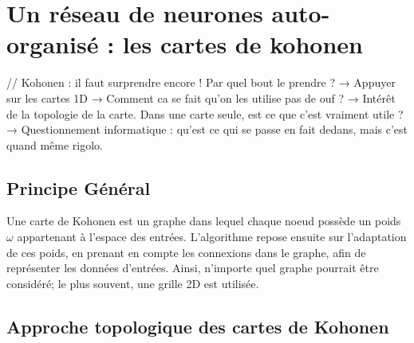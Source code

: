 \chapter{Un réseau de neurones auto-organisé : les cartes de kohonen}
\graphicspath{{02-SOM/}}
// Kohonen : il faut surprendre encore ! Par quel 
bout le prendre ? 
→ Appuyer sur les cartes 1D
→ Comment ca se fait qu’on les utilise pas de ouf ? 
→  Intérêt de la topologie de la carte. Dans une carte seule, est ce que c’est vraiment utile ?
→ Questionnement informatique : qu’est ce qui se passe en fait dedans, mais c’est quand même rigolo.

\section{Principe Général}
Une carte de Kohonen est un graphe dans lequel chaque noeud possède un poids $\omega$ appartenant à l'espace des entrées. L'algorithme repose ensuite sur l'adaptation de ces poids, en prenant en compte les connexions dans le graphe, afin de représenter les données d'entrées. 
Ainsi, n'importe quel graphe pourrait être considéré; le plus souvent, une grille 2D est utilisée.

\section{Approche topologique des cartes de Kohonen}

